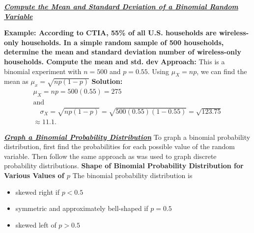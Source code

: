 \documentclass{report}
\begin{document}
      \pagebreak \bigbreak \noindent 
      \textbf{\textit{\underline{Compute the Mean and Standard Deviation of a Binomial Random Variable}}}
      \bigbreak \noindent 
      \begin{mdframed}
        \textbf{Example: According to CTIA, 55\% of all U.S. households are wireless-only households. In a simple random sample of 500 households, determine the mean and standard deviation number of wireless-only households. Compute the mean and std. dev}
        \bigbreak \noindent 
        \textbf{Approach:}
        \bigbreak \noindent 
        This is a binomial experiment with $n = 500$ and $p = 0.55$. Using $\mu_X = np$, we can find the mean as $\mu_{x} = \sqrt{np(1-p)} $
        \bigbreak \noindent 
        \textbf{Solution:}
        \bigbreak \noindent 
        \begin{align*}
            \mu_X = np = 500(0.55) = 275 \quad \\ \text{and} \\ \quad \sigma_X = \sqrt{np(1-p)} = \sqrt{500(0.55)(1-0.55)} = \sqrt{123.75} \\ \approx 11.1
        .\end{align*}

      \end{mdframed}

      \bigbreak \noindent \bigbreak \noindent 
      \textbf{\textit{\underline{Graph a Binomial Probability Distribution}}}
      \bigbreak \noindent 
      To graph a binomial probability distribution, first find the probabilities for each possible value of the random variable. Then follow the same approach as was used to graph discrete probability distributions.
      \bigbreak \noindent 
      \textbf{Shape of Binomial Probability Distribution for Various Values of $p $ }
      \bigbreak \noindent 
      The binomial probability distribution is
      \begin{itemize}
          \item skewed right if $p <0.5$
          \item symmetric and approximately bell-shaped if $p=0.5$
          \item skewed left of $p>0.5$ 
      \end{itemize}
\end{document}
